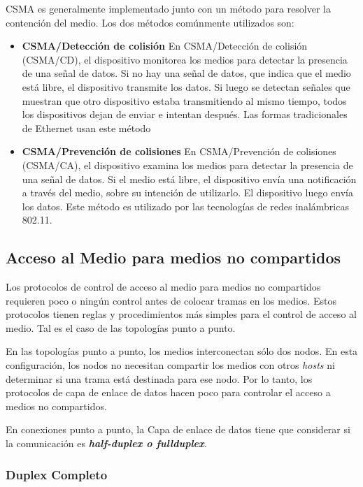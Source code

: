 \documentclass[a4paper]{article}
\begin{document}
	CSMA es generalmente implementado junto con un método para resolver la contención del medio. Los dos métodos comúnmente utilizados son:  
	
	\begin{itemize}
		\item \textbf{CSMA/Detección de colisión}   
		En CSMA/Detección de colisión (CSMA/CD), el dispositivo monitorea los medios para detectar la presencia de una señal de datos. Si no hay una señal de datos, que indica que el medio está libre, el dispositivo transmite los datos. Si luego se detectan señales que muestran que otro dispositivo estaba transmitiendo al mismo tiempo, todos los dispositivos dejan de enviar e intentan después. Las formas tradicionales de Ethernet usan este método
		
		\item \textbf{CSMA/Prevención de colisiones}   
		En CSMA/Prevención de colisiones (CSMA/CA), el dispositivo examina los medios para detectar la presencia de una señal de datos. Si el medio está libre, el dispositivo envía una notificación a través del medio, sobre su intención de utilizarlo. El dispositivo luego envía los datos. Este método es utilizado por las tecnologías de redes inalámbricas 802.11.
	\end{itemize}
	
	\subsection{Acceso al Medio para medios no compartidos}
	Los protocolos de control de acceso al medio para medios no compartidos requieren poco o ningún control antes de colocar tramas en los medios. Estos protocolos tienen reglas y procedimientos más simples para el control de acceso al medio. Tal es el caso de las topologías punto a punto.  
	
	En las topologías punto a punto, los medios interconectan sólo dos nodos. En esta configuración, los nodos no necesitan compartir los medios con otros \textit{hosts} ni determinar si una trama está destinada para ese nodo. Por lo tanto, los protocolos de capa de enlace de datos hacen poco para controlar el acceso a medios no compartidos.
	
	En conexiones punto a punto, la Capa de enlace de datos tiene que considerar si la comunicación es \textit{\textbf{half-duplex o fullduplex}}.  
	
	\subsubsection{Duplex Completo}
	
\end{document}
